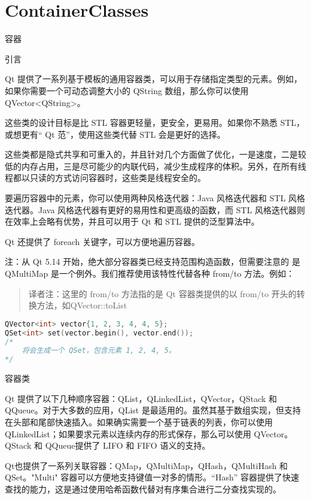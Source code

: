 \chapter{ContainerClasses}

容器

\splitLine

引言

Qt 提供了一系列基于模板的通用容器类，可以用于存储指定类型的元素。例如，如果你需要一个可动态调整大小的 QString 数组，那么你可以使用 QVector<QString>。

这些类的设计目标是比 STL 容器更轻量，更安全，更易用。如果你不熟悉 STL，或想更有“ Qt 范”，使用这些类代替 STL 会是更好的选择。

这些类都是隐式共享和可重入的，并且针对几个方面做了优化，一是速度，二是较低的内存占用，三是尽可能少的内联代码，减少生成程序的体积。另外，在所有线程都以只读的方式访问容器时，这些类是线程安全的。

要遍历容器中的元素，你可以使用两种风格迭代器：Java 风格迭代器和 STL 风格迭代器。Java 风格迭代器有更好的易用性和更高级的函数，而 STL 风格迭代器则在效率上会略有优势，并且可以用于 Qt 和 STL 提供的泛型算法中。

Qt 还提供了 foreach 关键字，可以方便地遍历容器。

注：从 Qt 5.14 开始，绝大部分容器类已经支持范围构造函数，但需要注意的
是 QMultiMap 是一个例外。我们推荐使用该特性代替各种 from/to 方法。例如：

\begin{quote}
译者注：这里的 from/to 方法指的是 Qt 容器类提供的以 from/to 开头的转换方法，如QVector::toList
\end{quote}

\begin{lstlisting}[language=C++]
QVector<int> vector{1, 2, 3, 4, 4, 5};
QSet<int> set(vector.begin(), vector.end());
/*
    将会生成一个 QSet，包含元素 1, 2, 4, 5。
*/
\end{lstlisting}

容器类

\splitLine

Qt 提供了以下几种顺序容器：QList，QLinkedList，QVector，QStack 和 QQueue。对于大多数的应用，QList 是最适用的。虽然其基于数组实现，但支持在头部和尾部快速插入。如果确实需要一个基于链表的列表，你可以使用 QLinkedList；如果要求元素以连续内存的形式保存，那么可以使用 QVector。QStack 和 QQueue提供了 LIFO 和 FIFO 语义的支持。

Qt也提供了一系列关联容器：QMap，QMultiMap，QHash，QMultiHash 和 QSet。"Multi" 容器可以方便地支持键值一对多的情形。“Hash” 容器提供了快速查找的能力，这是通过使用哈希函数代替对有序集合进行二分查找实现的。

